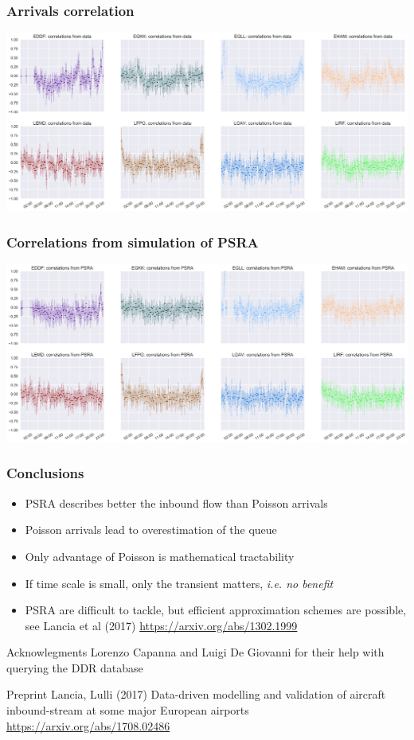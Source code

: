 \documentclass[table,aspectratio=169]{beamer}
\begin{document}
\begin{frame}[t]\frametitle{Arrivals correlation}
    \centering
    \includegraphics[width=.9\textwidth]{correlations_true}
\end{frame}

\begin{frame}[t]\frametitle{Correlations from simulation of PSRA}
    \centering
    \includegraphics[width=.9\textwidth]{correlations_psra}
\end{frame}

\begin{frame}[t]\frametitle{Conclusions}
    \begin{itemize}
        \item PSRA describes better the inbound flow than Poisson arrivals
        \item Poisson arrivals lead to \alert{overestimation of the queue}
        \item Only advantage of Poisson is mathematical tractability
        \item If time scale is small, \alert{only the transient matters, \emph{i.e. no benefit}}
        \item PSRA are difficult to tackle, but efficient approximation schemes are possible, see Lancia et al (2017) \url{https://arxiv.org/abs/1302.1999}
    \end{itemize}

    \begin{alertblock}{Acknowlegments}
        Lorenzo Capanna and Luigi De Giovanni for their help with querying the DDR database
    \end{alertblock}

    \begin{alertblock}{Preprint}
        Lancia, Lulli (2017) Data-driven modelling and validation of aircraft inbound-stream at some major European airports \url{https://arxiv.org/abs/1708.02486}
    \end{alertblock}
\end{frame}
\end{document}
